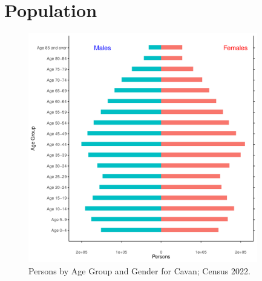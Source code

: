 \documentclass{article}
\begin{document}
\pagebreak

\section{Population} 
\label{sect:Pop}

\begin{figure}[h]
	\centering
	\includegraphics[width = 100mm]{../figures/PyramidPlot.pdf}
	\caption{Persons by Age Group and Gender for Cavan; Census 2022.}
	\label{fig:2ae19629-1a6a-13a3-e055-000000000001}
	\end{figure}
\end{document}
